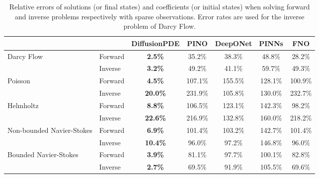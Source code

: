 
\begin{table}[t!]
    \caption{Relative errors of solutions (or final states) and coefficients (or initial states) when solving forward and inverse problems respectively with sparse observations. Error rates are used for the inverse problem of Darcy Flow.}
    \label{table:merged_results}
    \centering
    \begin{tabular}{p{2cm}lccccc}
        \toprule
        & & DiffusionPDE & PINO & DeepONet & PINNs & FNO \\
        \midrule
        \multirow{2}{*}{Darcy Flow} & Forward & \textbf{2.5\%} & 35.2\% & 38.3\% & 48.8\% & 28.2\% \\
        & Inverse & \textbf{3.2\%} & 49.2\% & 41.1\% & 59.7\% & 49.3\% \\
        \midrule
        \multirow{2}{*}{Poisson} & Forward & \textbf{4.5\%} & 107.1\% & 155.5\% & 128.1\% & 100.9\% \\
        & Inverse & \textbf{20.0\%} & 231.9\% & 105.8\% & 130.0\% & 232.7\% \\
        \midrule
        \multirow{2}{*}{Helmholtz} & Forward & \textbf{8.8\%} & 106.5\% & 123.1\% & 142.3\% & 98.2\% \\
        & Inverse & \textbf{22.6\%} & 216.9\% & 132.8\% & 160.0\% & 218.2\% \\
        \midrule
        \multirow{2}{2cm}{Non-bounded Navier-Stokes} & Forward & \textbf{6.9\%} & 101.4\% & 103.2\% & 142.7\% & 101.4\% \\
        & Inverse & \textbf{10.4\%} & 96.0\% & 97.2\% & 146.8\% & 96.0\% \\
        \midrule
        \multirow{2}{2cm}{Bounded Navier-Stokes} & Forward & \textbf{3.9\%} & 81.1\% & 97.7\% & 100.1\% & 82.8\% \\
        & Inverse & \textbf{2.7\%} & 69.5\% & 91.9\% & 105.5\% & 69.6\% \\
        \bottomrule
    \end{tabular}
\end{table}



